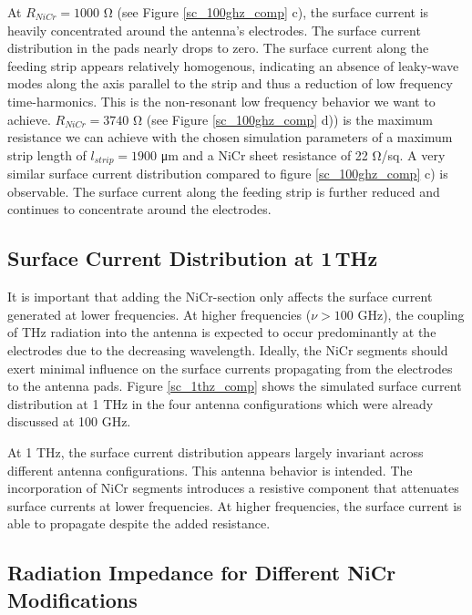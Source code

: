 At $R_{NiCr} = 1000$ \si{\ohm} (see Figure \ref{sc_100ghz_comp} c), the surface current is heavily concentrated around the antenna's electrodes. The surface current distribution in the pads nearly drops to zero. The surface current along the feeding strip appears relatively homogenous, indicating an absence of leaky-wave modes along the axis parallel to the strip and thus a reduction of low frequency time-harmonics. This is the non-resonant low frequency behavior we want to achieve. $R_{NiCr} = 3740$ \si{\ohm} (see Figure \ref{sc_100ghz_comp} d)) is the maximum resistance we can achieve with the chosen simulation parameters of a maximum strip length of $l_{strip} = 1900$ \si{\micro \meter} and a NiCr sheet resistance of \num{22} \si{\ohm/sq}. A very similar surface current distribution compared to figure \ref{sc_100ghz_comp} c) is observable. The surface current along the feeding strip is further reduced and continues to concentrate around the electrodes. 

\subsection{Surface Current Distribution at 1\,THz}

It is important that adding the NiCr-section only affects the surface current generated at lower frequencies. At higher frequencies ($\nu > 100$ \si{\giga \hertz}), the coupling of THz radiation into the antenna is expected to occur predominantly at the electrodes due to the decreasing wavelength. Ideally, the NiCr segments should exert minimal influence on the surface currents propagating from the electrodes to the antenna pads. Figure \ref{sc_1thz_comp} shows the simulated surface current distribution at \num{1} \si{\tera \hertz} in the four antenna configurations which were already discussed at \num{100} \si{\giga \hertz}. 

At \num{1} \si{\tera \hertz}, the surface current distribution appears largely invariant across different antenna configurations. This antenna behavior is intended. The incorporation of NiCr segments introduces a resistive component that attenuates surface currents at lower frequencies. At higher frequencies, the surface current is able to propagate despite the added resistance. 

\subsection{Radiation Impedance for Different NiCr Modifications}

